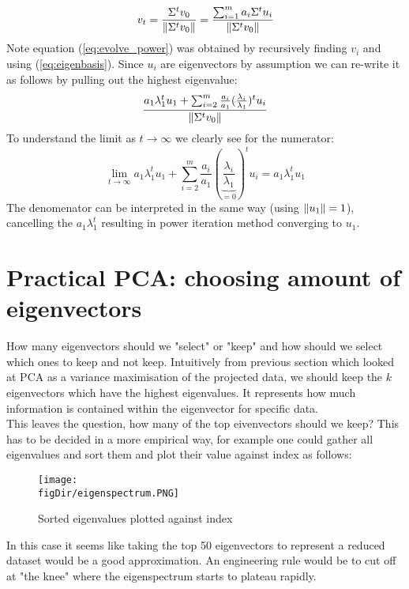 	\begin{equation}
	\label{eq:evolve_power}
	v_{t} = \frac{\Sigma^t v_0}{\left\lVert\Sigma^t v_0\right\rVert} = \frac{\sum_{i=1}^{m}a_i\Sigma^t u_i}{\left\lVert\Sigma^t v_0\right\rVert}
	\end{equation}
	Note equation (\ref{eq:evolve_power}) was obtained by recursively finding $v_i$ and using (\ref{eq:eigenbasis}). Since $u_i$ are eigenvectors by assumption we can re-write it as follows by pulling out the highest eigenvalue:
	\begin{equation}
	\frac{a_1\lambda_1^tu_1 + \sum_{i=2}^{m}\frac{a_i}{a_1}(\frac{\lambda_i}{\lambda_1})^t u_i}{\left\lVert\Sigma^t v_0\right\rVert}
	\end{equation}
	To understand the limit as $t\rightarrow\infty$ we clearly see for the numerator:
	\begin{equation}
	\lim_{t\rightarrow\infty}a_1\lambda_1^tu_1 + \sum_{i=2}^{m}\frac{a_i}{a_1}(\underbrace{\frac{\lambda_i}{\lambda_1}}_{=0})^t u_i = a_1\lambda_1^tu_1
	\end{equation}
	The denomenator can be interpreted in the same way (using $\left\lVert u_1\right\rVert = 1$), cancelling the $a_1\lambda_1^t$ resulting in power iteration method converging to $u_1$.
	\section{Practical PCA: choosing amount of eigenvectors}
	How many eigenvectors should we "select" or "keep" and how should we select which ones to keep and not keep. Intuitively from previous section which looked at PCA as a variance maximisation of the projected data, we should keep the $k$ eigenvectors which have the highest eigenvalues. It represents how much information is contained within the eigenvector for specific data.\\
	
	This leaves the question, how many of the top eivenvectors should we keep? This has to be decided in a more empirical way, for example one could gather all eigenvalues and sort them and plot their value against index as follows:
	\begin{figure}[h!]
		\centering
		\texttt{[image: \\figDir/eigenspectrum.PNG]}
		\label{fig:eigenspectrum}
		\caption{Sorted eigenvalues plotted against index}
	\end{figure}
	\pagebreak
	In this case it seems like taking the top 50 eigenvectors to represent a reduced dataset would be a good approximation. An engineering rule would be to cut off at "the knee" where the eigenspectrum starts to plateau rapidly.
